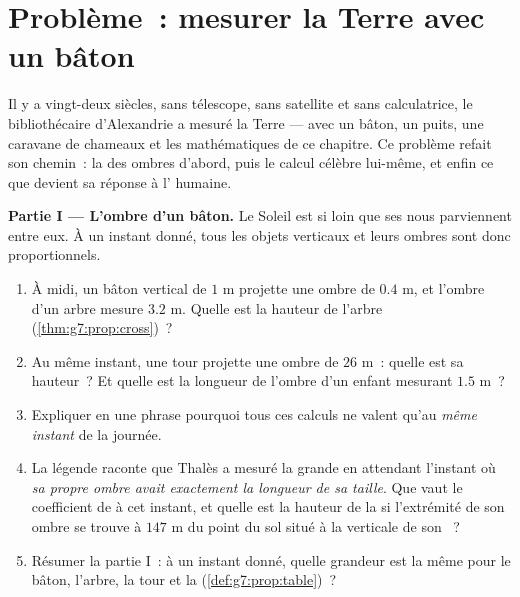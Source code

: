 \section{Problème~: mesurer la Terre avec un bâton}

\begin{problem}
\label{pb:g7:prop:1}
Il y a vingt-deux siècles, sans télescope, sans satellite et sans
calculatrice, le bibliothécaire d'Alexandrie a mesuré la Terre ---
avec un bâton, un puits, une caravane de chameaux et les
mathématiques de ce chapitre. Ce problème refait son chemin~: la
 des ombres d'abord, puis le calcul célèbre
lui-même, et enfin ce que devient sa réponse à l' humaine.

\medskip
\noindent\textbf{Partie I --- L'ombre d'un bâton.}
Le Soleil est si loin que ses  nous parviennent 
entre eux. À un instant donné, tous les objets verticaux et leurs
ombres sont donc proportionnels.
\begin{enumerate}
  \item À midi, un bâton vertical de $1$ m projette une ombre de
        $0.4$ m, et l'ombre d'un arbre mesure $3.2$ m. Quelle est la
        hauteur de l'arbre (\cref{thm:g7:prop:cross})~?
  \item Au même instant, une tour projette une ombre de $26$ m~:
        quelle est sa hauteur~? Et quelle est la longueur de l'ombre
        d'un enfant mesurant $1.5$ m~?
  \item Expliquer en une phrase pourquoi tous ces calculs ne valent
        qu'au \emph{même instant} de la journée.
  \item La légende raconte que Thalès a mesuré la grande  en
        attendant l'instant où \emph{sa propre ombre avait exactement
        la longueur de sa taille}. Que vaut le coefficient de
         à cet instant, et quelle est la hauteur de
        la  si l'extrémité de son ombre se trouve à $147$ m
        du point du sol situé à la verticale de son ~?
  \item Résumer la partie I~: à un instant donné, quelle grandeur
        est la même pour le bâton, l'arbre, la tour et la 
        (\cref{def:g7:prop:table})~?
\end{enumerate}


\end{problem}
